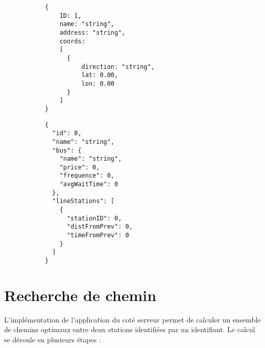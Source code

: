 \begin{figure}[h!]
\begin{subfigure}[b]{0.45\linewidth}
\begin{lstlisting}[caption=Format JSON de Station]
{
	ID: 1,
	name: "string",
	address: "string",
	coords: 
	[
	  {
	  	  direction: "string",
  		  lat: 0.00,
   		  lon: 0.00
	  }
	]
}
\end{lstlisting}
\end{subfigure}\hfill%
\begin{subfigure}[b]{0.45\linewidth}
\begin{lstlisting}[caption=Format JSON de Line]
{
  "id": 0,
  "name": "string",
  "bus": {
    "name": "string",
    "price": 0,
    "frequence": 0,
    "avgWaitTime": 0
  },
  "lineStations": [
    {
      "stationID": 0,
      "distFromPrev": 0,
      "timeFromPrev": 0
    }
  ]
}
\end{lstlisting}
\end{subfigure}\hfill%
\end{figure}

\section{Recherche de chemin}
	L'implémentation de l'application du coté serveur permet de calculer un ensemble de chemins optimaux entre deux stations identifiées par un identifiant. Le calcul se déroule en plusieurs étapes :
